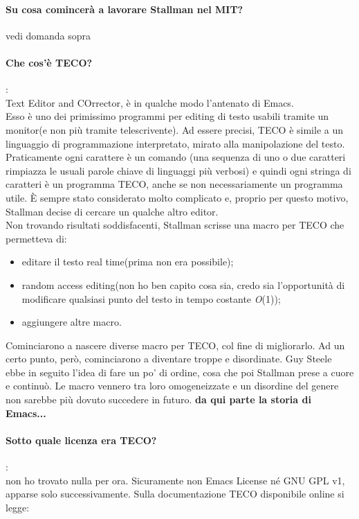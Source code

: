 \documentclass[a4paper]{article}
\begin{document}
		\paragraph{Su cosa comincerà a lavorare Stallman nel MIT?}
		vedi domanda sopra
		\paragraph{Che cos'è TECO?}: \\
		Text Editor and COrrector, è in qualche modo l'antenato di Emacs.\\
		Esso è uno dei primissimo programmi per editing di testo usabili tramite un monitor(e non più tramite telescrivente). Ad essere precisi, TECO è simile a un linguaggio di programmazione interpretato, mirato alla manipolazione del testo. Praticamente ogni carattere è un comando (una sequenza di uno o due caratteri rimpiazza le usuali parole chiave di linguaggi più verbosi) e quindi ogni stringa di caratteri è un programma TECO, anche se non necessariamente un programma utile. È sempre stato considerato molto complicato e, proprio per questo motivo, Stallman decise di cercare un qualche altro editor. \\
		Non trovando risultati soddisfacenti, Stallman scrisse una macro per TECO che permetteva di:
		\begin{itemize}
			\item editare il testo real time(prima non era possibile);
			\item random access editing(non ho ben capito cosa sia, credo sia l'opportunità di modificare qualsiasi punto del testo in tempo costante \textit{O}(1));
			\item aggiungere altre macro.
		\end{itemize}
		Cominciarono a nascere diverse macro per TECO, col fine di migliorarlo.
		Ad un certo punto, però, cominciarono a diventare troppe e disordinate. Guy Steele ebbe in seguito l'idea di fare un po' di ordine, cosa che poi Stallman prese a cuore e continuò. Le macro vennero tra loro omogeneizzate e un disordine del genere non sarebbe più dovuto succedere in futuro. \textbf{da qui parte la storia di Emacs...}
	
		\paragraph{Sotto quale licenza era TECO?}:\\
		non ho trovato nulla per ora. Sicuramente non Emacs License né GNU GPL v1, apparse solo successivamente.
		Sulla documentazione TECO disponibile online si legge:\\
\end{document}

